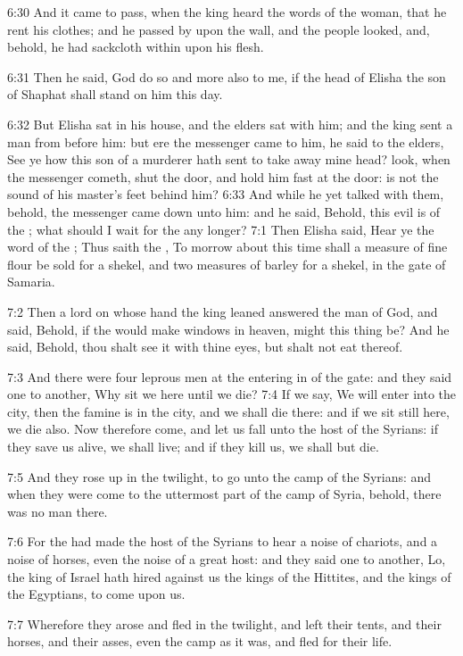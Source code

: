6:30 And it came to pass, when the king heard the words of the woman, that he rent his clothes; and he passed by upon the wall, and the people looked, and, behold, he had sackcloth within upon his flesh.

6:31 Then he said, God do so and more also to me, if the head of Elisha the son of Shaphat shall stand on him this day.

6:32 But Elisha sat in his house, and the elders sat with him; and the king sent a man from before him: but ere the messenger came to him, he said to the elders, See ye how this son of a murderer hath sent to take away mine head? look, when the messenger cometh, shut the door, and hold him fast at the door: is not the sound of his master's feet behind him?  6:33 And while he yet talked with them, behold, the messenger came down unto him: and he said, Behold, this evil is of the \LORD; what should I wait for the \LORD any longer?  7:1 Then Elisha said, Hear ye the word of the \LORD; Thus saith the \LORD, To morrow about this time shall a measure of fine flour be sold for a shekel, and two measures of barley for a shekel, in the gate of Samaria.

7:2 Then a lord on whose hand the king leaned answered the man of God, and said, Behold, if the \LORD would make windows in heaven, might this thing be?  And he said, Behold, thou shalt see it with thine eyes, but shalt not eat thereof.

7:3 And there were four leprous men at the entering in of the gate: and they said one to another, Why sit we here until we die?  7:4 If we say, We will enter into the city, then the famine is in the city, and we shall die there: and if we sit still here, we die also. Now therefore come, and let us fall unto the host of the Syrians: if they save us alive, we shall live; and if they kill us, we shall but die.

7:5 And they rose up in the twilight, to go unto the camp of the Syrians: and when they were come to the uttermost part of the camp of Syria, behold, there was no man there.

7:6 For the \LORD had made the host of the Syrians to hear a noise of chariots, and a noise of horses, even the noise of a great host: and they said one to another, Lo, the king of Israel hath hired against us the kings of the Hittites, and the kings of the Egyptians, to come upon us.

7:7 Wherefore they arose and fled in the twilight, and left their tents, and their horses, and their asses, even the camp as it was, and fled for their life.

